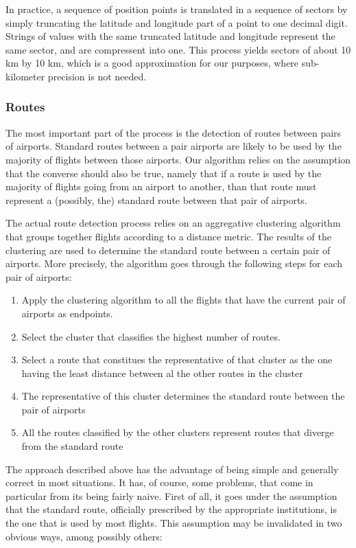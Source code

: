 \documentclass{vldb}
\begin{document}
In practice, a sequence of position points is translated in a sequence of
sectors by simply truncating the latitude and longitude part of a point to one
decimal digit. Strings of values with the same truncated latitude and
longitude represent the same sector, and are compressent into one. This process
yields sectors of about 10 km by 10 km, which is a good approximation for our
purposes, where sub-kilometer precision is not needed.

\subsubsection{Routes}

The most important part of the process is the detection of routes between pairs
of airports. Standard routes between a pair airports are likely to be used by
the majority of flights between those airports. Our algorithm relies on the
assumption that the converse should also be true, namely that if a route is used
by the majority of flights going from an airport to another, than that route
must represent a (possibly, the) standard route between that pair of airports.

The actual route detection process relies on an aggregative clustering algorithm
that groups together flights according to a distance metric. The results of the
clustering are used to determine the standard route between a certain pair of
airports. More precisely, the algorithm goes through the following steps for
each pair of airports:

\begin{enumerate}
  \item Apply the clustering algorithm to all the flights that have the
  current pair of airports as endpoints.
  \item Select the cluster that classifies the highest number of routes.
  \item Select a route that constitues the representative of
  that cluster as the one having the least distance between al the other
  routes in the cluster
  \item The representative of this cluster determines the standard route
  between the pair of airports
  \item All the routes classified by the other clusters represent routes that
  diverge from the standard route
\end{enumerate}

The approach described above has the advantage of being simple and generally
correct in most situations. It has, of course, some problems, that come in
particular from its being fairly naive. First of all, it goes under the
assumption that the standard route, officially prescribed by the
appropriate institutions, is the one that is used by most flights. This
assumption may be invalidated in two obvious ways, among possibly others:
\end{document}
